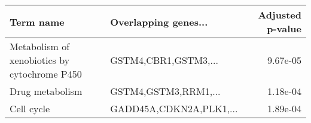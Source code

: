 \begin{tabular}{llr}
\toprule
                                   Term name &    Overlapping genes... &  Adjusted p-value \\
\midrule
Metabolism of xenobiotics by cytochrome P450 &    GSTM4,CBR1,GSTM3,... &          9.67e-05 \\
                             Drug metabolism &    GSTM4,GSTM3,RRM1,... &          1.18e-04 \\
                                  Cell cycle & GADD45A,CDKN2A,PLK1,... &          1.89e-04 \\
\bottomrule
\end{tabular}
